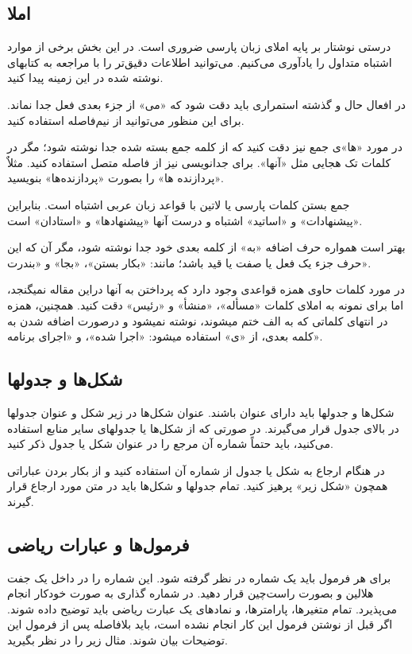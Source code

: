 \documentclass{CCI2020}
\begin{document}
\subsection{املا}
درستی نوشتار بر پایه املای زبان پارسی ضروری است. در این بخش برخی از موارد اشتباه متداول را یادآوری می‌کنیم. می‌توانید اطلاعات دقیق‌تر را با مراجعه به کتاب­های نوشته شده در این زمینه پیدا کنید.

در افعال حال و گذشته استمراری باید دقت شود که «می» از جزء بعدی فعل جدا نماند. برای این منظور می‌توانید از نیم‌فاصله استفاده کنید.

در مورد «ها»ی جمع نیز دقت کنید که از کلمه جمع بسته شده جدا نوشته شود؛ مگر در کلمات تک هجایی مثل «آنها». برای جدانویسی نیز از فاصله متصل استفاده کنید. مثلاٌ «پردازنده ها» را بصورت «پردازنده‌­ها» بنویسید.

جمع بستن کلمات پارسی یا لاتین با قواعد زبان عربی اشتباه است. بنابراین «پیشنهادات» و «اساتید» اشتباه و درست آنها «پیشنهادها» و «استادان» است.

بهتر است همواره حرف اضافه «به» از کلمه بعدی خود جدا نوشته شود، مگر آن که این حرف جزء یک فعل یا صفت یا قید باشد؛ مانند: «بکار بستن»، «بجا» و «بندرت».

در مورد کلمات حاوی همزه قواعدی وجود دارد که پرداختن به آنها دراین مقاله نمی­گنجد، اما برای نمونه به املای کلمات «مسأله»، «منشأ» و «رئیس» دقت کنید. همچنین، همزه در انتهای کلماتی که به الف ختم می­شوند، نوشته نمی­شود و درصورت اضافه شدن به کلمه بعدی، از «ی» استفاده می­شود: «اجرا شده»، و «اجرای برنامه».


\subsection{شکل‌ها و جدول­ها}
شکل‌ها و جدول­ها باید دارای عنوان باشند. عنوان شکل‌ها در زیر شکل و عنوان جدول­ها در بالای جدول قرار می‌گیرند. در صورتی که از شکل‌ها یا جدول­های سایر منابع استفاده می‌کنید، باید حتماً شماره آن مرجع را در عنوان شکل یا جدول ذکر کنید.

در هنگام ارجاع به شکل یا جدول از شماره آن استفاده کنید و از بکار بردن عباراتی همچون «شکل زیر» پرهیز کنید. تمام جدول­ها و شکل‌ها باید در متن مورد ارجاع قرار گیرند. 


\subsection{ فرمول‌ها و عبارات ریاضی}
برای هر فرمول باید یک شماره در نظر گرفته شود. این شماره را در داخل یک جفت هلالین و بصورت راست‌چین قرار دهید.  در  
 \lr{\LaTeX}
   شماره گذاری به صورت خودکار انجام می‌پذیرد. تمام متغیرها، پارامترها، و نمادهای یک عبارت ریاضی باید توضیح داده شوند. اگر قبل از نوشتن فرمول این کار انجام نشده است، باید بلافاصله پس از فرمول این توضیحات بیان شوند. مثال زیر را در نظر بگیرید.
\end{document}
